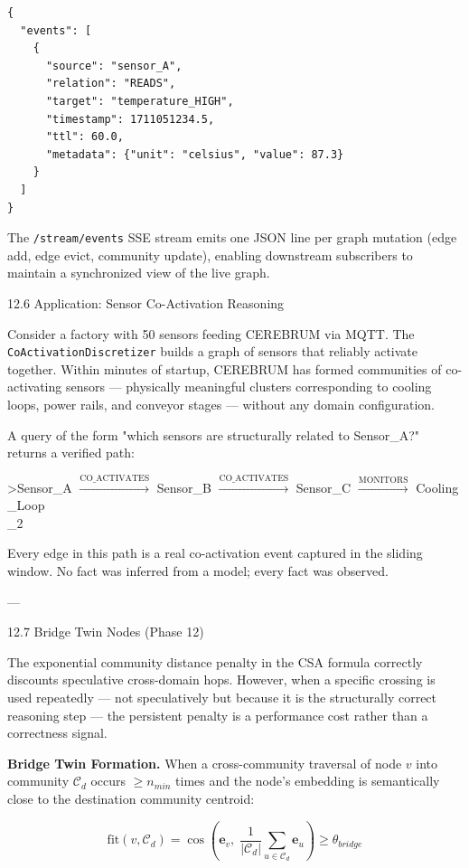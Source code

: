 \documentclass[10pt,journal,compsoc]{IEEEtran}
\begin{document}
\begin{lstlisting}
{
  "events": [
    {
      "source": "sensor_A",
      "relation": "READS",
      "target": "temperature_HIGH",
      "timestamp": 1711051234.5,
      "ttl": 60.0,
      "metadata": {"unit": "celsius", "value": 87.3}
    }
  ]
}
\end{lstlisting}

The \texttt{/stream/events} SSE stream emits one JSON line per graph mutation (edge add, edge evict, community update), enabling downstream subscribers to maintain a synch\-ronized view of the live graph.

12.6 Application: Sensor Co-Activation Reasoning

Consider a factory with 50 sensors feeding CEREBRUM via MQTT. The \texttt{CoActivationDiscretizer} builds a graph of sensors that reliably activate together. Within minutes of startup, CEREBRUM has formed communities of co-activating sensors — physically meaningful clusters corre\-sponding to cooling loops, power rails, and conveyor stages — without any domain confi\-guration.

A query of the form "which sensors are struc\-turally related to Sensor\_A?" returns a verified path:

\textgreater  Sensor\_A $\xrightarrow{\text{CO\_ACTIVATES}}$ Sensor\_B $\xrightarrow{\text{CO\_ACTIVATES}}$ Sensor\_C $\xrightarrow{\text{MONITORS}}$ Cooling\\_Loop\\_2

Every edge in this path is a real co-activation event captured in the sliding window. No fact was inferred from a model; every fact was observed.

---

12.7 Bridge Twin Nodes (Phase 12)

The exponential community distance penalty in the CSA formula correctly discounts speculative cross-domain hops. However, when a specific crossing is used repeatedly — not specu\-latively but because it is the struc\-turally correct reasoning step — the persistent penalty is a performance cost rather than a correctness signal.

\textbf{Bridge Twin Formation.} When a cross-community traversal of node $v$ into community $\mathcal{C}_d$ occurs $\geq n_{min}$ times and the node's embedding is seman\-tically close to the destination community centroid:

\begin{equation}
\text{fit}(v, \mathcal{C}_d) = \cos\!\left(\mathbf{e}_v,\; \frac{1}{|\mathcal{C}_d|}\sum_{u \in \mathcal{C}_d} \mathbf{e}_u\right) \geq \theta_{bridge}
\end{equation}
\end{document}
